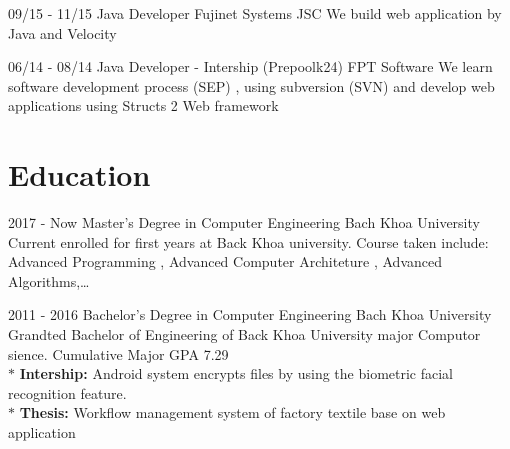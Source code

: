 \documentclass[]{friggeri-cv}
\begin{document}
\begin{entrylist}
  \entry
    {09/15 - 11/15}
    {Java Developer}
    {Fujinet Systems JSC}
    {We build web application by Java and Velocity\\}
\end{entrylist}

\begin{entrylist}
    \entry
    {06/14 - 08/14}
    {Java Developer - Intership (Prepoolk24)}
    {FPT Software}
    {We learn software development process (SEP) , using subversion (SVN) and develop web applications using Structs 2 Web framework\\}
\end{entrylist}
\section{Education}
\begin{entrylist}
  \entry
    {2017 - Now}
    {Master's Degree in Computer Engineering}
    {Bach Khoa University}
    {Current enrolled for first years at Back Khoa university. Course taken include: 
Advanced Programming , Advanced Computer Architeture , Advanced Algorithms,…\\}
\end{entrylist}
\begin{entrylist}
  \entry
    {2011 - 2016}
    {Bachelor's Degree in Computer Engineering}
    {Bach Khoa University}
    {Grandted Bachelor of Engineering of Back Khoa University major Computor sience. Cumulative Major GPA 7.29\\
       $*$ \textbf{Intership:} Android system encrypts files by using the biometric facial recognition feature.\\
       $*$ \textbf{Thesis:} 	Workflow management system of factory textile base on web application\\}
\end{entrylist}

\end{document}
